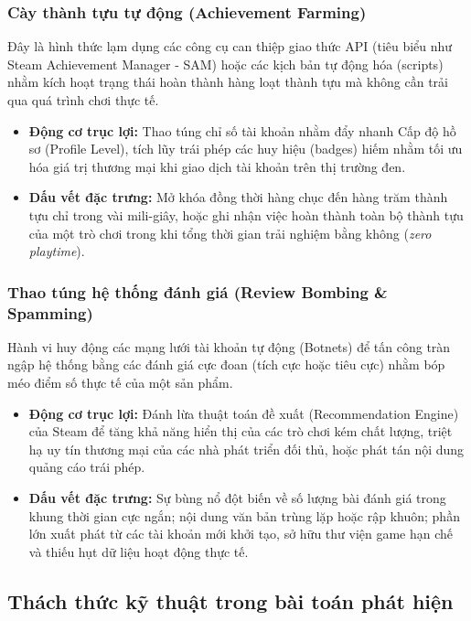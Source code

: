 \subsubsection{Cày thành tựu tự động (Achievement Farming)}
Đây là hình thức lạm dụng các công cụ can thiệp giao thức API (tiêu biểu như Steam Achievement Manager - SAM) hoặc các kịch bản tự động hóa (scripts) nhằm kích hoạt trạng thái hoàn thành hàng loạt thành tựu mà không cần trải qua quá trình chơi thực tế.
\begin{itemize}
    \item \textbf{Động cơ trục lợi:} Thao túng chỉ số tài khoản nhằm đẩy nhanh Cấp độ hồ sơ (Profile Level), tích lũy trái phép các huy hiệu (badges) hiếm nhằm tối ưu hóa giá trị thương mại khi giao dịch tài khoản trên thị trường đen.
    \item \textbf{Dấu vết đặc trưng:} Mở khóa đồng thời hàng chục đến hàng trăm thành tựu chỉ trong vài mili-giây, hoặc ghi nhận việc hoàn thành toàn bộ thành tựu của một trò chơi trong khi tổng thời gian trải nghiệm bằng không (\textit{zero playtime}).
\end{itemize}

\subsubsection{Thao túng hệ thống đánh giá (Review Bombing \& Spamming)}
Hành vi huy động các mạng lưới tài khoản tự động (Botnets) để tấn công tràn ngập hệ thống bằng các đánh giá cực đoan (tích cực hoặc tiêu cực) nhằm bóp méo điểm số thực tế của một sản phẩm.
\begin{itemize}
    \item \textbf{Động cơ trục lợi:} Đánh lừa thuật toán đề xuất (Recommendation Engine) của Steam để tăng khả năng hiển thị của các trò chơi kém chất lượng, triệt hạ uy tín thương mại của các nhà phát triển đối thủ, hoặc phát tán nội dung quảng cáo trái phép.
    \item \textbf{Dấu vết đặc trưng:} Sự bùng nổ đột biến về số lượng bài đánh giá trong khung thời gian cực ngắn; nội dung văn bản trùng lặp hoặc rập khuôn; phần lớn xuất phát từ các tài khoản mới khởi tạo, sở hữu thư viện game hạn chế và thiếu hụt dữ liệu hoạt động thực tế.
\end{itemize}

\subsection{Thách thức kỹ thuật trong bài toán phát hiện}

